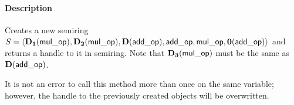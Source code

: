 \paragraph{Description}

Creates a new semiring $S = \langle \bold{D_1}({\sf mul\_op}), 
\bold{D_2}({\sf mul\_op}), \bold{D}({\sf add\_op}), {\sf add\_op}, 
{\sf mul\_op}, \bold{0}({\sf add\_op})\rangle$ and returns a handle to it in 
{\sf semiring}.  Note that $\bold{D_3}({\sf mul\_op})$ must be the same as 
$\bold{D}({\sf add\_op})$.

It is not an error to call this method more than once on the same variable;  
however, the handle to the previously created objects will be overwritten. 
